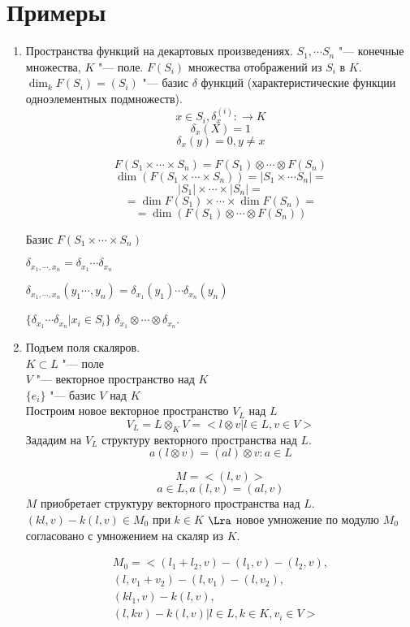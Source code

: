 ﻿\section{Примеры}
\begin{enumerate}
    \item Пространства функций на декартовых произведениях. 
    $S_1, \cdots S_n$ "--- конечные множества, $K$ "--- поле. 
    $F(S_i)$ множества отображений из $S_i$ в $K$.
    $\dim_k F(S_i) = (S_i)$ "--- базис $\delta$ функций (характеристические функции одноэлементных подмножеств).
    $$x \in S_i, \delta_{x}^{(i)} \colon \to K$$
    $$\delta_{x}(X) = 1$$
    $$\delta_{x}(y) = 0, y \ne x$$

    $$F(S_1 \times \cdots \times S_n) = F(S_1) \otimes \cdots \otimes F(S_n)$$
    $$\dim(F(S_1 \times \cdots \times S_n)) = |S_1 \times \cdots S_n| = $$
    $$|S_1| \times \cdots \times |S_n| = $$
    $$= \dim F(S_1) \times \cdots \times \dim F(S_n) = $$
    $$= \dim (F(S_1) \otimes \cdots \otimes F(S_n))$$

    Базис $F(S_1 \times \cdots \times S_n)$

    $\delta_{x_1, \cdots, x_n} = \delta_{x_1} \cdots \delta_{x_n}$

    $\delta_{x_1, \cdots, x_n}(y_1 \cdots, y_n) = \delta_{x_1}(y_1) \cdots \delta_{x_n}(y_n)$

    $\{\delta_{x_1} \cdots \delta_{x_n}| x_i \in S_i\}$ 
    $\delta_{x_1} \otimes \cdots \otimes \delta_{x_n}$.
\item
Подъем поля скаляров.\\
$K \subset L$ "--- поле\\
$V$ "--- векторное пространство над $K$\\
$\{e_i\}$ "--- базис $V$ над $K$\\
Построим новое векторное пространство $V_L$ над $L$\\
$$V_L = L \otimes_{K} V = < l \otimes v | l \in L, v \in V >$$
Зададим на $V_L$ структуру векторного пространства над $L$.
$$a(l \otimes v) = (al) \otimes v \colon a \in L $$

$$M = <(l, v)>$$
$$a \in L, a(l,v) = (al, v)$$
$M$ приобретает структуру векторного пространства над $L$.
$(kl, v) - k(l, v) \in M_0$ при $k \in K$ $\Lra$ новое умножение 
по модулю $M_0$ согласовано с умножением на скаляр из $K$.

\begin{gather*}
M_0 = <(l_1 + l_2, v) - (l_1, v) - (l_2, v), \\
         (l, v_1 + v_2) - (l, v_1) - (l, v_2), \\
         (kl_1, v) - k(l, v),\\ 
         (l, kv) - k(l, v) | l \in L, k \in K, v_i \in V>
\end{gather*}


\end{enumerate}
